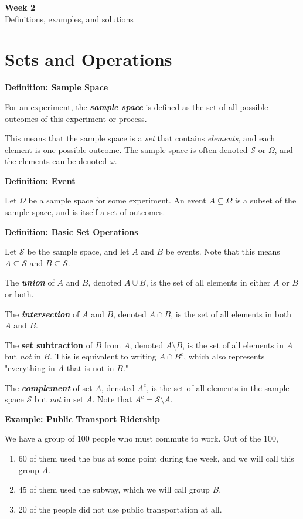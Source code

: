 \documentclass[11pt,letterpaper]{article}
\newcommand{\blocktitle}[1]{\par\addvspace{9pt}\noindent\textbf{#1}\par\nopagebreak\vspace{2pt}\nopagebreak}
\begin{document}
\begin{center}
  {\Large\bfseries Week 2}\\[4pt]
  {\normalsize Definitions, examples, and solutions}
\end{center}

\section*{Sets and Operations}

\blocktitle{Definition: Sample Space}

For an experiment, the \emph{\textbf{sample space}} is defined as the set of all possible outcomes of this experiment or process.

This means that the sample space is a \emph{set} that contains \emph{elements}, and each element is one possible outcome. The sample space is often denoted $\mathcal S$ or $\Omega$, and the elements can be denoted $\omega$.

\blocktitle{Definition: Event}

Let $\Omega$ be a sample space for some experiment. An event $A \subseteq \Omega$ is a subset of the sample space, and is itself a set of outcomes.

\blocktitle{Definition: Basic Set Operations}

Let $\mathcal S$ be the sample space, and let $A$ and $B$ be events. Note that this means $A \subseteq \mathcal S$ and $B \subseteq \mathcal S$.

The \emph{\textbf{union}} of $A$ and $B$, denoted $A \cup B$, is the set of all elements in either $A$ or $B$ or both.

The \emph{\textbf{intersection}} of $A$ and $B$, denoted $A \cap B$, is the set of all elements in both $A$ and $B$.

The \textbf{set subtraction} of $B$ from $A$, denoted $A \setminus B$, is the set of all elements in $A$ but \emph{not} in $B$. This is equivalent to writing $A \cap B^c$, which also represents "everything in $A$ that is not in $B$."

The \emph{\textbf{complement}} of set $A$, denoted $A^c$, is the set of all elements in the sample space $\mathcal S$ but \emph{not} in set $A$. Note that $A^c = \mathcal S \setminus A$.

\blocktitle{Example: Public Transport Ridership}

We have a group of 100 people who must commute to work. Out of the 100,

\begin{enumerate}[label=\roman*.]

\item 60 of them used the bus at some point during the week, and we will call this group $A$.

\item 45 of them used the subway, which we will call group $B$.

\item 20 of the people did not use public transportation at all.

\end{enumerate}
\end{document}
